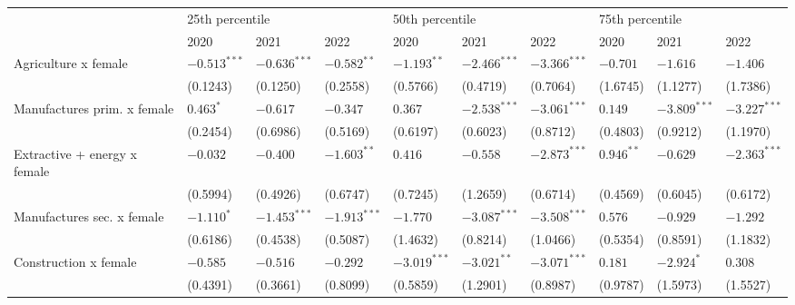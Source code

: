 \begin{tabular}{llllllllll}
\toprule
{} & \multicolumn{3}{l}{25th percentile} & \multicolumn{3}{l}{50th percentile} & \multicolumn{3}{l}{75th percentile} \\
{} &            2020 &            2021 &            2022 &            2020 &            2021 &            2022 &            2020 &            2021 &            2022 \\
\midrule
Agriculture x female             &  $-0.513^{***}$ &  $-0.636^{***}$ &   $-0.582^{**}$ &   $-1.193^{**}$ &  $-2.466^{***}$ &  $-3.366^{***}$ &        $-0.701$ &        $-1.616$ &        $-1.406$ \\
                                 &        (0.1243) &        (0.1250) &        (0.2558) &        (0.5766) &        (0.4719) &        (0.7064) &        (1.6745) &        (1.1277) &        (1.7386) \\
Manufactures prim. x female      &       $0.463^*$ &        $-0.617$ &        $-0.347$ &         $0.367$ &  $-2.538^{***}$ &  $-3.061^{***}$ &         $0.149$ &  $-3.809^{***}$ &  $-3.227^{***}$ \\
                                 &        (0.2454) &        (0.6986) &        (0.5169) &        (0.6197) &        (0.6023) &        (0.8712) &        (0.4803) &        (0.9212) &        (1.1970) \\
Extractive + energy x female     &        $-0.032$ &        $-0.400$ &   $-1.603^{**}$ &         $0.416$ &        $-0.558$ &  $-2.873^{***}$ &    $0.946^{**}$ &        $-0.629$ &  $-2.363^{***}$ \\
                                 &        (0.5994) &        (0.4926) &        (0.6747) &        (0.7245) &        (1.2659) &        (0.6714) &        (0.4569) &        (0.6045) &        (0.6172) \\
Manufactures sec. x female       &      $-1.110^*$ &  $-1.453^{***}$ &  $-1.913^{***}$ &        $-1.770$ &  $-3.087^{***}$ &  $-3.508^{***}$ &         $0.576$ &        $-0.929$ &        $-1.292$ \\
                                 &        (0.6186) &        (0.4538) &        (0.5087) &        (1.4632) &        (0.8214) &        (1.0466) &        (0.5354) &        (0.8591) &        (1.1832) \\
Construction x female            &        $-0.585$ &        $-0.516$ &        $-0.292$ &  $-3.019^{***}$ &   $-3.021^{**}$ &  $-3.071^{***}$ &         $0.181$ &      $-2.924^*$ &         $0.308$ \\
                                 &        (0.4391) &        (0.3661) &        (0.8099) &        (0.5859) &        (1.2901) &        (0.8987) &        (0.9787) &        (1.5973) &        (1.5527) \\

\end{tabular}
